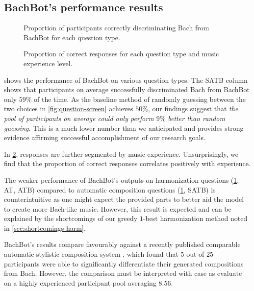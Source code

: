 \subsection{BachBot's performance results}

\begin{figure}[tb]
  \centering
  
  \caption{Proportion of participants correctly discriminating Bach from BachBot for each question type.}
  \label{fig:responses-mask}
\end{figure}

\begin{figure}[tb]
  \centering
  
  \caption{Proportion of correct responses for each question type and music experience level.}
  \label{fig:responses-mask-musicExperience}
\end{figure}

 shows the performance of BachBot on various question
types. The SATB column shows that participants on average successfully
discriminated Bach from BachBot only $59\%$ of the time. As the baseline method
of randomly guessing between the two choices in \cref{fig:question-screen}
achieves $50\%$, our findings suggest that \emph{the pool of participants on
average could only perform $9\%$ better than random guessing}. This is a much
lower number than we anticipated and provides strong evidence affirming successful
accomplishment of our research goals.

In \cref{fig:responses-mask-musicExperience}, responses are further segmented
by music experience. Unsurprisingly, we find that the proportion of correct responses
correlates positively with experience.

The weaker performance of BachBot's outputs on harmonization questions
(\cref{fig:responses-mask}, AT, ATB) compared to automatic composition
questions (\cref{fig:responses-mask}, SATB) is counterintuitive as one might
expect the provided parts to better aid the model to create more Bach-like
music. However, this result is expected and can be explained by the
shortcomings of our greedy $1$-best harmonization method noted in
\vref{sec:shortcomings-harm}.

BachBot's results compare favourably against a recently published comparable
automatic stylistic composition system \citep{collins2016developing}, which
found that $5$ out of $25$ participants were able to significantly
differentiate their generated compositions from Bach. However, the comparison
must be interpreted with case as \citet{collins2016developing} evaluate on a
highly experienced participant pool averaging $8.56$.

